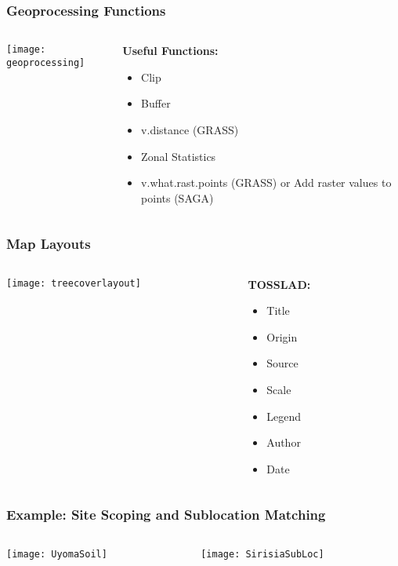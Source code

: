 \documentclass{beamer}
\begin{document}
\begin{frame}
\frametitle{Geoprocessing Functions}
 \begin{columns}
  \begin{column}[T]{0.6\textwidth}
   \texttt{[image: geoprocessing]}
  \end{column}
  
  \begin{column}[T]{0.4\textwidth}
   \textbf{Useful Functions:}
   \begin{itemize}
    \item Clip
    \item Buffer
    \item v.distance (GRASS)
    \item Zonal Statistics
    \item v.what.rast.points (GRASS) or Add raster values to points (SAGA)
   \end{itemize}
  \end{column}
 \end{columns}
\end{frame}

\begin{frame}
\frametitle{Map Layouts}
 \begin{columns}
  \begin{column}[T]{0.8\textwidth}
   \texttt{[image: treecoverlayout]}
  \end{column}
  \begin{column}[T]{0.2\textwidth}
   \textbf{TOSSLAD:}
	\begin{itemize}
	 \item Title
	 \item Origin
	 \item Source
	 \item Scale
	 \item Legend
	 \item Author
	 \item Date
	\end{itemize}
  \end{column}	
 \end{columns}
\end{frame}

\begin{frame}
\frametitle{Example: Site Scoping and Sublocation Matching}
\begin{columns}
 \begin{column}[T]{0.4\textwidth}
  \texttt{[image: UyomaSoil]}
 \end{column}
 \begin{column}[T]{0.6\textwidth}
  \texttt{[image: SirisiaSubLoc]}
 \end{column}
\end{columns}
  
\end{frame}
\end{document}
